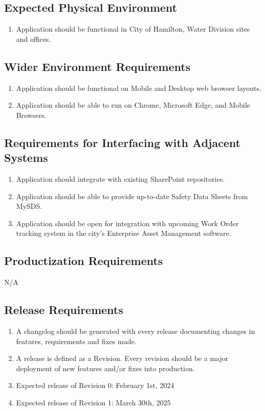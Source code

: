 \documentclass[12pt]{article}
\begin{document}
\subsection{Expected Physical Environment}
\begin{enumerate} [{OE-PE}1.]
  \item Application should be functional in City of Hamilton, Water
    Division sites and offices.
\end{enumerate}
\subsection{Wider Environment Requirements}
\begin{enumerate} [{OE-WE}1.]
  \item Application should be functional on Mobile and Desktop web
    browser layouts.
  \item Application should be able to run on Chrome, Microsoft Edge,
    and Mobile Browsers.
\end{enumerate}
\subsection{Requirements for Interfacing with Adjacent Systems}
\begin{enumerate} [{OE-IAS}1.]
  \item Application should integrate with existing SharePoint repositories.
  \item Application should be able to provide up-to-date Safety Data
    Sheets from MySDS.
  \item Application should be open for integration with upcoming Work
    Order tracking system in the city's Enterprise Asset Management software.
\end{enumerate}
\subsection{Productization Requirements}
N/A
\subsection{Release Requirements}
\begin{enumerate} [{OE-REL}1.]
  \item A changelog should be generated with every release
    documenting changes in features, requirements and fixes made.
  \item A release is defined as a Revision. Every revision should be
    a major deployment of new features and/or fixes into production.
  \item Expected release of Revision 0: February 1st, 2024
  \item Expected release of Revision 1: March 30th, 2025
\end{enumerate}
\end{document}

